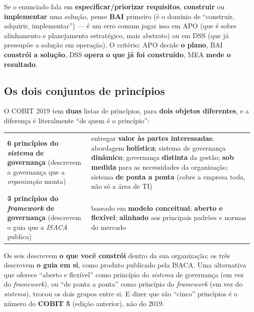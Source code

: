 \begin{regrapratica}
Se o enunciado fala em \textbf{especificar/priorizar requisitos},
\textbf{construir} ou \textbf{implementar} uma solução, pense
\textbf{BAI} primeiro (é o domínio de “construir, adquirir, implementar”) ---
é um erro comum jogar isso em APO (que é sobre alinhamento e planejamento
estratégico, mais abstrato) ou em DSS (que já pressupõe a solução em
operação). O critério: APO decide \textbf{o plano}, BAI \textbf{constrói a
solução}, DSS \textbf{opera o que já foi construído}, MEA \textbf{mede o
resultado}.
\end{regrapratica}

\subsection{Os dois conjuntos de princípios}

\begin{conceito}
O COBIT 2019 tem \textbf{duas} listas de princípios, para \textbf{dois
objetos diferentes}, e a diferença é literalmente “de quem é o princípio”:

\begin{center}
\begin{tabular}{@{}p{4.2cm}p{7.4cm}@{}}
\toprule
\textbf{6 princípios do \emph{sistema} de governança} (descrevem a
governança que a \emph{organização} monta) & entregar \textbf{valor às
partes interessadas}; abordagem \textbf{holística}; sistema de governança
\textbf{dinâmico}; governança \textbf{distinta} da gestão; \textbf{sob
medida} para as necessidades da organização; sistema \textbf{de ponta a
ponta} (cobre a empresa toda, não só a área de TI) \\
\addlinespace
\textbf{3 princípios do \emph{framework} de governança} (descrevem o guia
que a \emph{ISACA} publica) & baseado em \textbf{modelo conceitual};
\textbf{aberto e flexível}; \textbf{alinhado} aos principais padrões e
normas do mercado \\
\bottomrule
\end{tabular}
\end{center}

Os seis descrevem \textbf{o que você constrói} dentro da sua organização; os
três descrevem \textbf{o guia em si}, como produto publicado pela ISACA. Uma
alternativa que oferece “aberto e flexível” como princípio do
\emph{sistema} de governança (em vez do \emph{framework}), ou “de ponta a
ponta” como princípio do \emph{framework} (em vez do \emph{sistema}), trocou
os dois grupos entre si. E dizer que são “cinco” princípios é o número do
\textbf{COBIT 5} (edição anterior), não do 2019.
\end{conceito}

